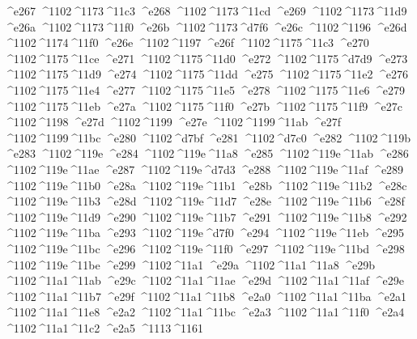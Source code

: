 \checkit ^^^^e267 ^^^^1102^^^^1173^^^^11c3
\checkit ^^^^e268 ^^^^1102^^^^1173^^^^11cd
\checkit ^^^^e269 ^^^^1102^^^^1173^^^^11d9
\checkit ^^^^e26a ^^^^1102^^^^1173^^^^11f0
\checkit ^^^^e26b ^^^^1102^^^^1173^^^^d7f6
\checkit ^^^^e26c ^^^^1102^^^^1196
\checkit ^^^^e26d ^^^^1102^^^^1174^^^^11f0
\checkit ^^^^e26e ^^^^1102^^^^1197
\checkit ^^^^e26f ^^^^1102^^^^1175^^^^11c3
\checkit ^^^^e270 ^^^^1102^^^^1175^^^^11ce
\checkit ^^^^e271 ^^^^1102^^^^1175^^^^11d0
\checkit ^^^^e272 ^^^^1102^^^^1175^^^^d7d9
\checkit ^^^^e273 ^^^^1102^^^^1175^^^^11d9
\checkit ^^^^e274 ^^^^1102^^^^1175^^^^11dd
\checkit ^^^^e275 ^^^^1102^^^^1175^^^^11e2
\checkit ^^^^e276 ^^^^1102^^^^1175^^^^11e4
\checkit ^^^^e277 ^^^^1102^^^^1175^^^^11e5
\checkit ^^^^e278 ^^^^1102^^^^1175^^^^11e6
\checkit ^^^^e279 ^^^^1102^^^^1175^^^^11eb
\checkit ^^^^e27a ^^^^1102^^^^1175^^^^11f0
\checkit ^^^^e27b ^^^^1102^^^^1175^^^^11f9
\checkit ^^^^e27c ^^^^1102^^^^1198
\checkit ^^^^e27d ^^^^1102^^^^1199
\checkit ^^^^e27e ^^^^1102^^^^1199^^^^11ab
\checkit ^^^^e27f ^^^^1102^^^^1199^^^^11bc
\checkit ^^^^e280 ^^^^1102^^^^d7bf
\checkit ^^^^e281 ^^^^1102^^^^d7c0
\checkit ^^^^e282 ^^^^1102^^^^119b
\checkit ^^^^e283 ^^^^1102^^^^119e
\checkit ^^^^e284 ^^^^1102^^^^119e^^^^11a8
\checkit ^^^^e285 ^^^^1102^^^^119e^^^^11ab
\checkit ^^^^e286 ^^^^1102^^^^119e^^^^11ae
\checkit ^^^^e287 ^^^^1102^^^^119e^^^^d7d3
\checkit ^^^^e288 ^^^^1102^^^^119e^^^^11af
\checkit ^^^^e289 ^^^^1102^^^^119e^^^^11b0
\checkit ^^^^e28a ^^^^1102^^^^119e^^^^11b1
\checkit ^^^^e28b ^^^^1102^^^^119e^^^^11b2
\checkit ^^^^e28c ^^^^1102^^^^119e^^^^11b3
\checkit ^^^^e28d ^^^^1102^^^^119e^^^^11d7
\checkit ^^^^e28e ^^^^1102^^^^119e^^^^11b6
\checkit ^^^^e28f ^^^^1102^^^^119e^^^^11d9
\checkit ^^^^e290 ^^^^1102^^^^119e^^^^11b7
\checkit ^^^^e291 ^^^^1102^^^^119e^^^^11b8
\checkit ^^^^e292 ^^^^1102^^^^119e^^^^11ba
\checkit ^^^^e293 ^^^^1102^^^^119e^^^^d7f0
\checkit ^^^^e294 ^^^^1102^^^^119e^^^^11eb
\checkit ^^^^e295 ^^^^1102^^^^119e^^^^11bc
\checkit ^^^^e296 ^^^^1102^^^^119e^^^^11f0
\checkit ^^^^e297 ^^^^1102^^^^119e^^^^11bd
\checkit ^^^^e298 ^^^^1102^^^^119e^^^^11be
\checkit ^^^^e299 ^^^^1102^^^^11a1
\checkit ^^^^e29a ^^^^1102^^^^11a1^^^^11a8
\checkit ^^^^e29b ^^^^1102^^^^11a1^^^^11ab
\checkit ^^^^e29c ^^^^1102^^^^11a1^^^^11ae
\checkit ^^^^e29d ^^^^1102^^^^11a1^^^^11af
\checkit ^^^^e29e ^^^^1102^^^^11a1^^^^11b7
\checkit ^^^^e29f ^^^^1102^^^^11a1^^^^11b8
\checkit ^^^^e2a0 ^^^^1102^^^^11a1^^^^11ba
\checkit ^^^^e2a1 ^^^^1102^^^^11a1^^^^11e8
\checkit ^^^^e2a2 ^^^^1102^^^^11a1^^^^11bc
\checkit ^^^^e2a3 ^^^^1102^^^^11a1^^^^11f0
\checkit ^^^^e2a4 ^^^^1102^^^^11a1^^^^11c2
\checkit ^^^^e2a5 ^^^^1113^^^^1161
